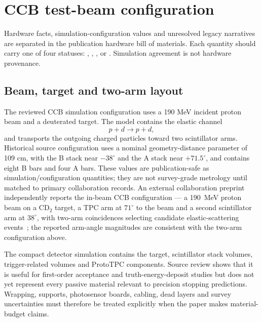 \section{CCB test-beam configuration}

Hardware facts, simulation-configuration values and unresolved legacy narratives are separated in the publication hardware bill of materials. Each quantity should carry one of four statuses: , , , or . Simulation agreement is not hardware provenance.

\subsection{Beam, target and two-arm layout}

The reviewed CCB simulation configuration uses a 190 MeV incident proton beam and a deuterated target. The model contains the elastic channel
\[
  p+d\rightarrow p+d,
\]
and transports the outgoing charged particles toward two scintillator arms. Historical source configuration uses a nominal geometry-distance parameter of 109 cm, with the B stack near \(-38^{\circ}\) and the A stack near \(+71.5^{\circ}\), and contains eight B bars and four A bars. These values are publication-safe as simulation/configuration quantities; they are not survey-grade metrology until matched to primary collaboration records. An external collaboration preprint independently reports the in-beam CCB configuration --- a 190~MeV proton beam on a CD$_2$ target, a TPC arm at $71^\circ$ to the beam and a second scintillator arm at $38^\circ$, with two-arm coincidences selecting candidate elastic-scattering events~\cite{Rataj2026}; the reported arm-angle magnitudes are consistent with the two-arm configuration above.

The compact detector simulation contains the target, scintillator stack volumes, trigger-related volumes and ProtoTPC components. Source review shows that it is useful for first-order acceptance and truth-energy-deposit studies but does not yet represent every passive material relevant to precision stopping predictions. Wrapping, supports, photosensor boards, cabling, dead layers and survey uncertainties must therefore be treated explicitly when the paper makes material-budget claims.


